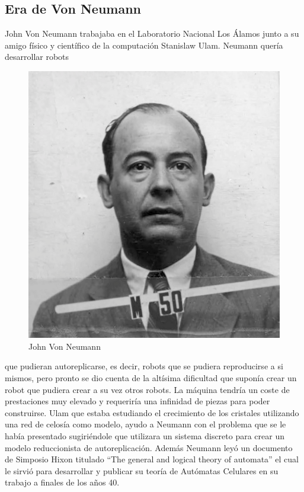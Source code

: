 \subsection{Era de Von Neumann} %
John Von Neumann trabajaba en el Laboratorio Nacional Los Álamos junto a su amigo físico y científico de la computación Stanislaw Ulam. Neumann quería desarrollar robots  
\begin{figure}
\centering
\includegraphics[scale=3]{imagenes/neumann.png}
\caption{John Von Neumann}
\label{fig:neumann}
\end{figure}
que pudieran autoreplicarse, es decir, robots que se pudiera reproducirse a si mismos, pero pronto se dio cuenta de la altísima dificultad que suponía crear un robot que pudiera crear a su vez otros robots. La máquina tendría un coste de prestaciones muy elevado y requeriría una infinidad de piezas para poder construirse. Ulam que estaba estudiando el crecimiento de los cristales utilizando una red de celosía como modelo, ayudo a Neumann con el problema que se le había presentado sugiriéndole que utilizara un sistema discreto para crear un modelo reduccionista de autoreplicación. Además Neumann leyó un documento de Simposio Hixon titulado ``The general and logical theory of automata'' el cual le sirvió para desarrollar y publicar su teoría de Autómatas Celulares en su trabajo \cite{Teoria_Von_neumann} a finales de los años 40. \\

